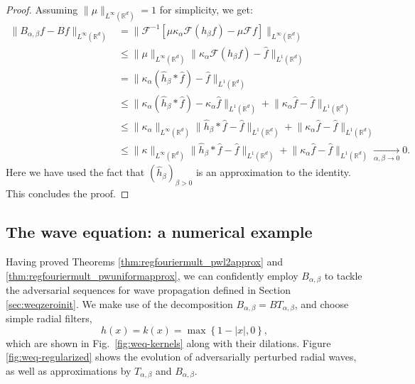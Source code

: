 \documentclass{article}
\theoremstyle{definition}
\newcommand{\R}{\mathbb{R}}
\newcommand{\smallnorm}[1]{\lVert#1\rVert}
\newcommand{\abs}[1]{\left\lvert#1\right\rvert}
\newcommand{\enorm}[1]{\abs{#1}}
\newcommand{\fourier}{\mathcal{F}}
\newcommand{\fhat}[1]{\widehat{#1}}
\begin{document}
\begin{proof}
    Assuming \(\smallnorm{\mu}_{L^\infty(\R^d)}=1\) for simplicity,
    we get:
    \begin{align*}
        \smallnorm{B_{\alpha,\beta}f - Bf}_{L^\infty(\R^d)}
        &=
        \smallnorm{
        \fourier^{-1}
        \left[
        \mu \kappa_\alpha \fourier (h_\beta f)
        -
        \mu \fourier f
        \right]
        }_{L^\infty(\R^d)}\\
        &\leq
        \smallnorm{\mu}_{L^\infty(\R^d)}
        \smallnorm{
        \kappa_\alpha \fourier (h_\beta f)
        -
        \fhat{f}  
        }_{L^1(\R^d)}\\
        &=
        \smallnorm{
        \kappa_\alpha \left( \fhat{h}_\beta *\fhat{f}\right)
        -
        \fhat{f}
        }_{L^1(\R^d)}\\
        &\leq
        \smallnorm{
        \kappa_\alpha \left( \fhat{h}_\beta *\fhat{f}\right)
        -
        \kappa_\alpha \fhat{f}
        }_{L^1(\R^d)}
        +
        \smallnorm{
        \kappa_\alpha \fhat{f}
        -
        \fhat{f}
        }_{L^1(\R^d)}\\
        &\leq
        \smallnorm{\kappa_\alpha}_{L^\infty(\R^d)}
        \smallnorm{
        \fhat{h}_\beta *\fhat{f}
        -
        \fhat{f}
        }_{L^1(\R^d)}
        +
        \smallnorm{
        \kappa_\alpha \fhat{f}
        -
        \fhat{f}
        }_{L^1(\R^d)}\\
        &\leq
        \smallnorm{\kappa}_{L^\infty(\R^d)}
        \smallnorm{
        \fhat{h}_\beta *\fhat{f}
        -
        \fhat{f}
        }_{L^1(\R^d)}
        +
        \smallnorm{
        \kappa_\alpha \fhat{f}
        -
        \fhat{f}
        }_{L^1(\R^d)}
        \xrightarrow[\alpha,\beta\to 0]{}0.
    \end{align*}
    Here we have used the fact that \((\fhat{h}_\beta)_{\beta>0}\) is an approximation to the identity.
    This concludes the proof.
\end{proof}




\subsection{The wave equation: a numerical example}
Having proved Theorems \ref{thm:regfouriermult_pwl2approx} and \ref{thm:regfouriermult_pwuniformapprox},
we can confidently employ \(B_{\alpha,\beta}\) to tackle the adversarial sequences for wave propagation defined in Section \ref{sec:weqzeroinit}.
We make use of the decomposition \(B_{\alpha,\beta}=BT_{\alpha,\beta}\),
and choose simple radial filters,
\begin{equation*}
    h(x) = k(x) = \max\left\{1-\enorm{x},0\right\},
\end{equation*}
which are shown in Fig.~\ref{fig:weq-kernels} along with their dilations.
Figure \ref{fig:weq-regularized} shows the evolution of adversarially perturbed radial waves, as well as approximations by \(T_{\alpha,\beta}\) and \(B_{\alpha,\beta}\).
\end{document}
